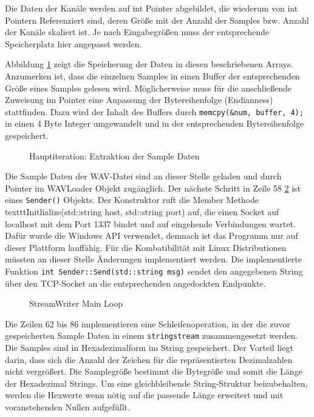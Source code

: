Die Daten der Kanäle werden auf int Pointer abgebildet, die wiederum von int Pointern Referenziert sind, deren Größe mit der Anzahl der Samples bzw. Anzahl der Kanäle skaliert ist. Je nach Eingabegrößen muss der entsprechende Speicherplatz hier angepasst werden.

Abbildung \ref{fig:extractionSamples} zeigt die Speicherung der Daten in diesen beschriebenen Arrays. Anzumerken ist, dass die einzelnen Samples in einen Buffer der entsprechenden Größe eines Samples gelesen wird. Möglicherweise muss für die anschließende Zuweisung im Pointer eine Anpassung der Bytereihenfolge (Endianness) stattfinden. Dazu wird der Inhalt des Buffers durch \texttt{memcpy(\&num, buffer, 4);} in einen 4 Byte Integer umgewandelt und in der entsprechenden Bytereihenfolge gespeichert.

\begin{figure}[t!]
	
	\caption{Hauptiteration: Extraktion der Sample Daten}
	\label{fig:extractionSamples}
\end{figure}

Die Sample Daten der WAV-Datei sind an dieser Stelle geladen und durch Pointer im WAVLoader Objekt zugänglich. Der nächste Schritt in Zeile 58 \ref{fig:WriterCPP} ist eines \texttt{Sender()} Objekts. Der Konstruktor ruft die Member Methode texttt{Initlialize(std::string host, std::string port)} auf, die einen Socket auf localhost mit dem Port 1337 bindet und auf eingehende Verbindungen wartet. Dafür wurde die Windows API verwendet, demnach ist das Programm nur auf dieser Plattform lauffähig. Für die Kombatibilität mit Linux Distributionen müssten an dieser Stelle Änderungen implementiert werden. Die implementierte Funktion \texttt{int Sender::Send(std::string msg)} sendet den angegebenen String über den TCP-Socket an die entsprechenden angedockten Endpunkte. 


\begin{figure}[t!]
	
	\caption{StreamWriter Main Loop}
	\label{fig:WriterCPP}
\end{figure}

Die Zeilen 62 bis 86 implementieren eine Schleifenoperation, in der die zuvor gespeicherten Sample Daten in einem \texttt{stringstream} zusammengesetzt werden. Die Samples sind in Hexadezimalform im String gespeichert. Der Vorteil liegt darin, dass sich die Anzahl der Zeichen für die repräsentierten Dezimalzahlen nicht vergrößert. Die Samplegröße bestimmt die Bytegröße und somit die Länge der Hexadezimal Strings. Um eine gleichbleibende String-Struktur beizubehalten, werden die Hexwerte wenn nötig auf die passende Länge erweitert und mit voranstehenden Nullen aufgefüllt.

